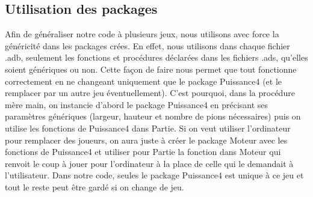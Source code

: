 \documentclass[a4paper, 10pt, french]{article}
\begin{document}
{    \subsection{Utilisation des packages}
    {
        Afin de généraliser notre code à plusieurs jeux, nous utilisons avec force la généricité dans les packages crées.
        En effet, nous utilisons dans chaque fichier .adb, seulement les fonctions et procédures déclarées dans les fichiers
        .ads, qu'elles soient génériques ou non. Cette façon de faire nous permet que tout fonctionne correctement en ne changeant
        uniquement que le package Puissance4 (et le remplacer par un autre jeu éventuellement).
        C'est pourquoi, dans la procédure mère main, on instancie d'abord le package Puissance4 en précisant ses paramètres
        génériques (largeur, hauteur et nombre de pions nécessaires) puis on utilise les fonctions de Puissance4 dans Partie.
        Si on veut utiliser l'ordinateur pour remplacer des joueurs, on aura juste à créer le package Moteur avec les fonctions
        de Puissance4 et utiliser pour Partie la fonction dans Moteur qui renvoit le coup à jouer pour l'ordinateur à la place de
        celle qui le demandait à l'utilisateur.
        Dans notre code, seules le package Puissance4 est unique à ce jeu et tout le reste peut être gardé si on change de jeu.
    }

    \newpage
} 

\end{document}
